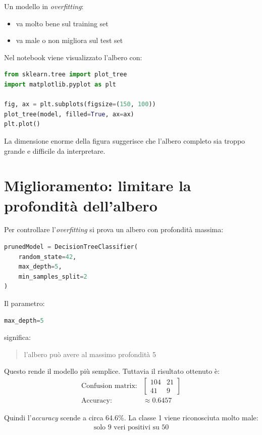 \documentclass[11pt,a4paper]{article}
\begin{document}
Un modello in \textit{overfitting}:
\begin{itemize}
    \item va molto bene sul training set
    \item va male o non migliora sul test set
\end{itemize}

Nel notebook viene visualizzato l'albero con:

\begin{lstlisting}[language=Python]
from sklearn.tree import plot_tree
import matplotlib.pyplot as plt

fig, ax = plt.subplots(figsize=(150, 100))
plot_tree(model, filled=True, ax=ax)
plt.plot()
\end{lstlisting}

La dimensione enorme della figura suggerisce che l'albero completo sia troppo grande e difficile da interpretare.

\section{Miglioramento: limitare la profondità dell'albero}
Per controllare l'\textit{overfitting} si prova un albero con profondità massima:

\begin{lstlisting}[language=Python]
prunedModel = DecisionTreeClassifier(
    random_state=42,
    max_depth=5,
    min_samples_split=2
)
\end{lstlisting}

Il parametro:
\begin{lstlisting}[language=Python]
max_depth=5
\end{lstlisting}

significa:
\begin{quote}
    l'albero può avere al massimo profondità 5
\end{quote}

Questo rende il modello più semplice. Tuttavia il risultato ottenuto è:
\begin{align*}
    \text{Confusion matrix:} &\begin{bmatrix} 104 & 21 \\ 41 & 9 \end{bmatrix} \\
    \text{Accuracy:} &\approx 0.6457
\end{align*}

Quindi l'\textit{accuracy} scende a circa 64.6\%. La classe 1 viene riconosciuta molto male:
\begin{align*}
    \text{solo 9 veri positivi su 50}
\end{align*}
\end{document}
